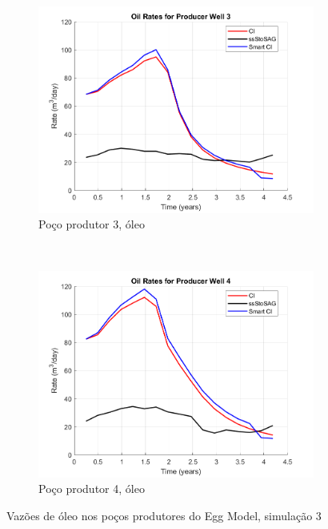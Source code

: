 \begin{figure}[!ht]
	\begin{subfigure}[b]{.3\textwidth}
		\includegraphics[width=\textwidth]{figs/resultadosEgg/imgsim3/EGG_OilWell3_Zoom}
		\caption{Po\c{c}o produtor 3, \'{o}leo}
		\label{EGG3_OilWell3}
	\end{subfigure}
	~
	\begin{subfigure}[b]{.3\textwidth}
		\includegraphics[width=\textwidth]{figs/resultadosEgg/imgsim3/EGG_OilWell4_Zoom}
		\caption{Po\c{c}o produtor 4, \'{o}leo}
		\label{EGG3_OilWell4}
	\end{subfigure}
	\caption{Vaz\~{o}es de \'{o}leo nos po\c{c}os produtores do Egg Model, simula\c{c}\~{a}o 3}
	\label{EGG3_OilRates}
\end{figure}

